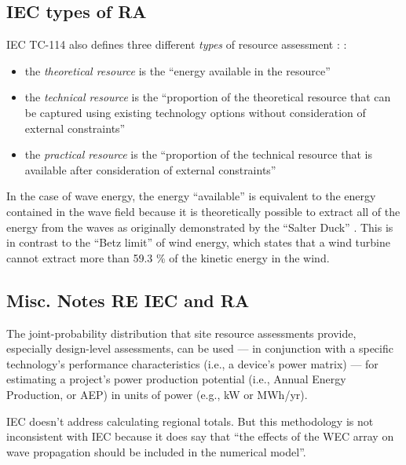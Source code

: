 \subsection{IEC types of RA}

IEC TC-114 also defines three different {\em types } of resource assessment \citep{internationalelectrotechnicalcommissionPartTerminology2011}:
:
\begin{itemize}
  \item the {\it theoretical resource} is the ``energy available in the resource''
  \item the {\it technical resource} is the ``proportion of the theoretical resource that can be captured using existing technology options without consideration of external constraints''
  \item the {\it practical resource} is the ``proportion of the technical resource that is available after consideration of external constraints''
\end{itemize}

In the case of wave energy, the energy ``available'' is equivalent to the energy contained in the wave field because it is theoretically possible to extract all of the energy from the waves as originally demonstrated by the ``Salter Duck'' \citep{salterRecentProgressDucks1980}. This is in contrast to the ``Betz limit'' of wind energy, which states that a wind turbine cannot extract more than 59.3 \% of the kinetic energy in the wind.

\subsection{Misc. Notes RE IEC and RA}

The joint-probability distribution that site resource assessments provide, especially design-level assessments, can be used  --- in conjunction with a specific technology's performance characteristics (i.e., a device's power matrix) --- for estimating a project's power production potential (i.e., Annual Energy Production, or AEP) in units of power (e.g., kW or MWh/yr).

IEC doesn't address calculating regional totals. But this methodology is not inconsistent with IEC because it does say that ``the effects of the WEC array on wave propagation should be included in the numerical model''. 

